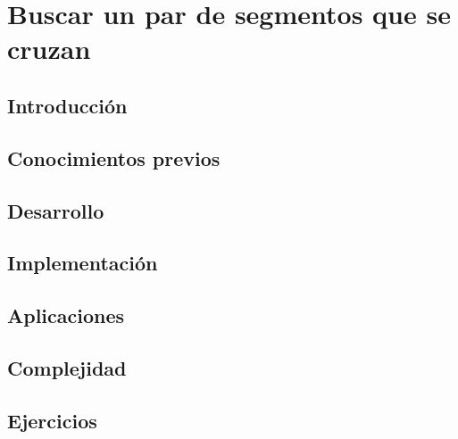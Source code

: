 \chapter{Buscar un par de segmentos que se cruzan}
\section{Introducción}

\section{Conocimientos previos}

\section{Desarrollo}

\section{Implementación}

\section{Aplicaciones}

\section{Complejidad}

\section{Ejercicios}
